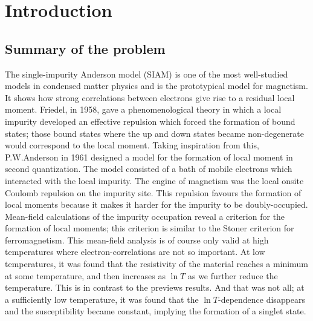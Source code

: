 \chapter{Introduction}
\section{Summary of the problem}
The single-impurity Anderson model (SIAM) is one of the most well-studied models in condensed matter physics and is the prototypical model for magnetism.
It shows how strong correlations between electrons give rise to a residual local moment. Friedel\cite{Friedel_1958}, in 1958, gave a phenomenological theory in which a local impurity developed an effective repulsion which forced the formation of bound states; those bound states where the up and down states became non-degenerate would correspond to the local moment.
Taking inspiration from this, P.W.Anderson\cite{anderson1970} in 1961 designed a model for the formation of local moment in second quantization.
The model consisted of a bath of mobile electrons which interacted with the local impurity.
The engine of magnetism was the local onsite Coulomb repulsion on the impurity site.
This repulsion favours the formation of local moments because it makes it harder for the impurity to be doubly-occupied.
 Mean-field calculations of the impurity occupation reveal a criterion for the formation of local moments; this criterion is similar to the Stoner criterion for ferromagnetism. This mean-field analysis is of course only valid at high temperatures where electron-correlations are not so important. At low temperatures, it was found that the resistivity of the material reaches a minimum at some temperature, and then increases as \(\ln T\) as we further reduce the temperature. This is in contrast to the previews results. And that was not all; at a sufficiently low temperature, it was found that the \(\ln T\)-dependence disappears and the susceptibility became constant, implying the formation of a singlet state.

